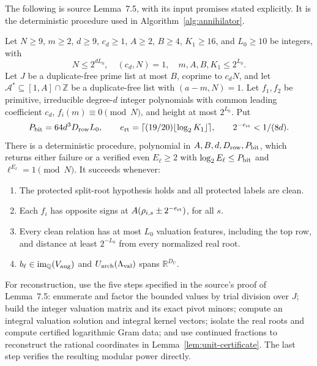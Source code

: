 The following is source Lemma~7.5, with its input promises stated
explicitly.  It is the deterministic procedure used in
Algorithm~\ref{alg:annihilator}.

\begin{lemma}
\label{lem:trypair}
Let \(N\ge9\), \(m\ge2\), \(d\ge9\), \(c_d\ge1\),
\(A\ge2\), \(B\ge4\), \(K_1\ge16\), and \(L_0\ge10\) be
integers, with
\[
 N\le2^{dL_0},\quad(c_d,N)=1,\quad
 m,A,B,K_1\le2^{L_0}.
\]
Let \(J\) be a duplicate-free prime list at most \(B\), coprime
to \(c_dN\), and let \(\mathcal A^*\subseteq[1,A]\cap\mathbb Z\)
be a duplicate-free list with \((a-m,N)=1\).
Let \(f_1,f_2\) be primitive, irreducible degree-\(d\) integer
polynomials with common leading coefficient \(c_d\),
\(f_i(m)\equiv0\pmod N\), and height at most \(2^{L_0}\).
Put
\[
 P_{\rm bit}=64d^3D_{\rm row}L_0,
 \qquad e_{\rm rt}=\lceil(19/20)\lfloor\log_2K_1\rfloor\rceil,
 \qquad 2^{-e_{\rm rt}}<1/(8d).
\]
There is a deterministic procedure, polynomial in
\(A,B,d,D_{\rm row},P_{\rm bit}\), which returns either failure
or a verified even \(E_\ell\ge2\) with
\(\log_2E_\ell\le P_{\rm bit}\) and \(\ell^{E_\ell}=1\pmod N\).
It succeeds whenever:
\begin{enumerate}[label=(\roman*)]
\item The protected split-root hypothesis holds and all protected
labels are clean.
\item Each \(f_i\) has opposite signs at
\(A(\rho_{i,s}\pm2^{-e_{\rm rt}})\), for all \(s\).
\item Every clean relation has at most \(L_0\) valuation features,
including the top row, and distance at least \(2^{-L_0}\) from
every normalized real root.
\item \(b_\ell\in\operatorname{im}_{\mathbb Q}(V_{\rm aug})\) and
\(U_{\rm arch}(\Lambda_{\rm val})\) spans \(\mathbb R^{D_U}\).
\end{enumerate}
\end{lemma}

For reconstruction, use the five steps specified in the source's
proof of Lemma~7.5: enumerate and factor the bounded values by trial
division over \(J\); build the integer valuation matrix and its
exact pivot minors; compute an integral valuation solution and
integral kernel vectors; isolate the real roots and compute certified
logarithmic Gram data; and use continued fractions to reconstruct
the rational coordinates in Lemma~\ref{lem:unit-certificate}.
The last step verifies the resulting modular power directly.

